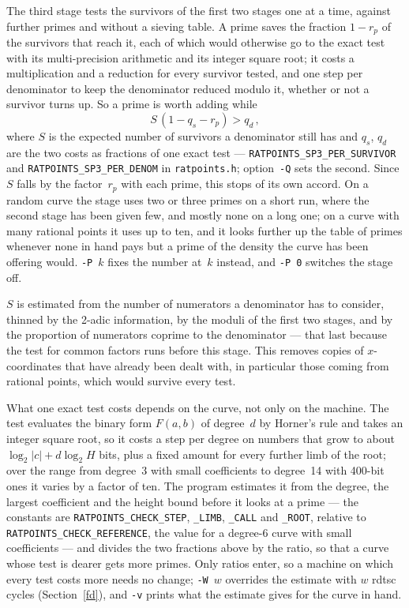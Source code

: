 \documentclass[12pt,a4paper,oneside]{amsart}
\begin{document}
The third stage tests the survivors of the first two stages one at a time, against
further primes and without a sieving table. A prime saves the fraction
$1 - r_p$ of the survivors that reach it, each of which would otherwise go
to the exact test with its multi-precision arithmetic and its integer square
root; it costs a multiplication and a reduction for every survivor tested,
and one step per denominator to keep the denominator reduced modulo it,
whether or not a survivor turns up. So a prime is worth adding while
\[ S\,(1 - q_s - r_p) > q_d \,, \]
where $S$ is the expected number of survivors a denominator still has and
$q_s$, $q_d$ are the two costs as fractions of one exact test ---
\texttt{RATPOINTS\_SP3\_PER\_SURVIVOR} and \texttt{RATPOINTS\_SP3\_PER\_DENOM}
in \texttt{ratpoints.h}; option~\verb+-Q+ sets the second. Since $S$ falls
by the factor~$r_p$ with each prime, this stops of its own accord. On a
random curve the stage uses two or three primes on a short run, where the
second stage has been given few, and mostly none on a long one; on a curve
with many rational points it uses up to ten, and it
looks further up the table of primes whenever none in hand pays but a prime
of the density the curve has been offering would. \verb+-P+~$k$ fixes the
number at~$k$ instead, and \verb+-P 0+ switches the stage off.

$S$ is estimated from the number of numerators a denominator has to
consider, thinned by the 2-adic information, by the moduli of the first two
stages, and by the proportion of numerators coprime to the denominator ---
that last because the test for common factors runs before this stage.
This removes copies of $x$-coordinates that have already been dealt with,
in particular those coming from rational points, which would survive
every test.

What one exact test costs depends on the curve, not only on the machine. The
test evaluates the binary form $F(a,b)$ of degree~$d$ by Horner's rule and
takes an integer square root, so it costs a step per degree on numbers that
grow to about $\log_2|c| + d\log_2 H$ bits, plus a fixed amount for every
further limb of the root; over the range from degree~3 with small
coefficients to degree~14 with 400-bit ones it varies by a factor of ten. The
program estimates it from the degree, the largest coefficient and the height
bound before it looks at a prime --- the constants are
\texttt{RATPOINTS\_CHECK\_STEP}, \texttt{\_LIMB}, \texttt{\_CALL} and
\texttt{\_ROOT}, relative to \texttt{RATPOINTS\_CHECK\_REFERENCE}, the value
for a degree-6 curve with small coefficients --- and divides the two fractions
above by the ratio, so that a curve whose test is dearer gets more primes.
Only ratios enter, so a machine on which every test costs more needs no
change; \verb+-W+~$w$ overrides the estimate with $w$ rdtsc cycles
(Section~\ref{fd}), and \verb+-v+
prints what the estimate gives for the curve in hand.
\end{document}
